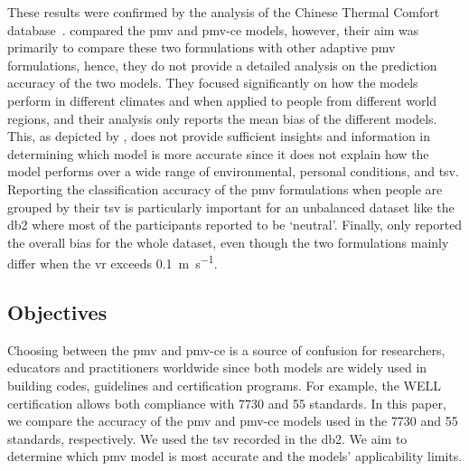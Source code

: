 These results were confirmed by the analysis of the Chinese Thermal Comfort database~\cite{du_evaluation_2022}.
 compared the \ac{pmv} and \ac{pmv-ce} models, however, their aim was primarily to compare these two formulations with other adaptive \ac{pmv} formulations, hence, they do not provide a detailed analysis on the prediction accuracy of the two models.
They focused significantly on how the models perform in different climates and when applied to people from different world regions, and their analysis only reports the mean bias of the different models.
This, as depicted by , does not provide sufficient insights and information in determining which model is more accurate since it does not explain how the model performs over a wide range of environmental, personal conditions, and \ac{tsv}.
Reporting the classification accuracy of the \ac{pmv} formulations when people are grouped by their \ac{tsv} is particularly important for an unbalanced dataset like the \ac{db2} where most of the participants reported to be `neutral'.
Finally,  only reported the overall bias for the whole dataset, even though the two formulations mainly differ when the \ac{vr} exceeds \qty{0.1}{\m\per\s}.

\subsection{Objectives}\label{subsec:aim-and-objectives}
Choosing between the \ac{pmv} and \ac{pmv-ce} is a source of confusion for researchers, educators and practitioners worldwide since both models are widely used in building codes, guidelines and certification programs.
For example, the WELL certification allows both compliance with \gls{7730} and \gls{55} standards.
In this paper, we compare the accuracy of the \ac{pmv} and \ac{pmv-ce} models used in the \gls{7730} and \gls{55} standards, respectively.
We used the \ac{tsv} recorded in the \acf{db2}.
We aim to determine which \ac{pmv} model is most accurate and the models' applicability limits.